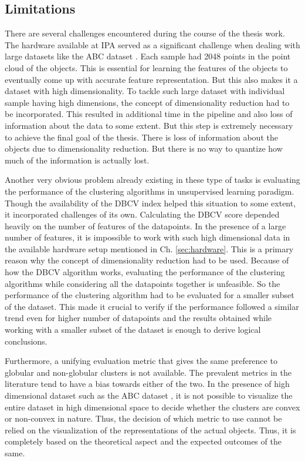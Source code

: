 \subsection{Limitations}
\label{sec:limitations}
There are several challenges encountered during the course of the thesis work. The hardware available at \ac{IPA} served as a significant challenge when dealing with large datasets like the ABC dataset \cite{Koch_2019_CVPR}. Each sample had 2048 points in the point cloud of the objects. This is essential for learning the features of the objects to eventually come up with accurate feature representation. But this also makes it a dataset with high dimensionality. To tackle such large dataset with individual sample having high dimensions, the concept of dimensionality reduction had to be incorporated. This resulted in additional time in the pipeline and also loss of information about the data to some extent. But this step is extremely necessary to achieve the final goal of the thesis. There is loss of information about the objects due to dimensionality reduction. But there is no way to quantize how much of the information is actually lost.

\vspace{5mm}

Another very obvious problem already existing in these type of tasks is evaluating the performance of the clustering algorithms in unsupervised learning paradigm. Though the availability of the \ac{DBCV} index helped this situation to some extent, it incorporated challenges of its own. Calculating the \ac{DBCV} score depended heavily on the number of features of the datapoints. In the presence of a large number of features, it is impossible to work with such high dimensional data in the available hardware setup mentioned in Ch. \ref{sec:hardware}. This is a primary reason why the concept of dimensionality reduction had to be used. Because of how the \ac{DBCV} algorithm works, evaluating the performance of the clustering algorithms while considering all the datapoints together is unfeasible. So the performance of the clustering algorithm had to be evaluated for a smaller subset of the dataset. This made it crucial to verify if the performance followed a similar trend even for higher number of datapoints and the results obtained while working with a smaller subset of the dataset is enough to derive logical conclusions.

\vspace{5mm}

Furthermore, a unifying evaluation metric that gives the same preference to globular and non-globular clusters is not available. The prevalent metrics in the literature tend to have a bias towards either of the two. In the presence of high dimensional dataset such as the ABC dataset \cite{Koch_2019_CVPR}, it is not possible to visualize the entire dataset in high dimensional space to decide whether the clusters are convex or non-convex in nature. Thus, the decision of which metric to use cannot be relied on the visualization of the representations of the actual objects. Thus, it is completely based on the theoretical aspect and the expected outcomes of the same. 

